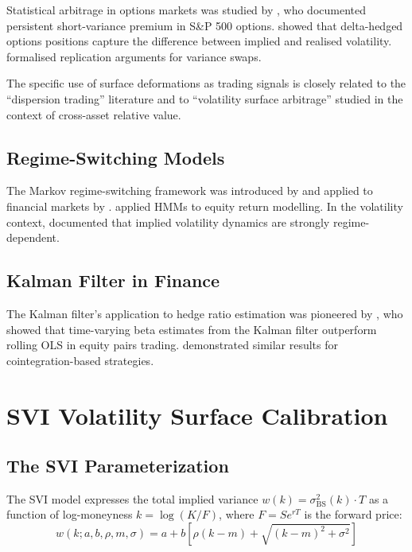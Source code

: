 \documentclass[12pt, letterpaper]{article}
\begin{document}
Statistical arbitrage in options markets was studied by
\citet{bondarenko2004statistical}, who documented persistent short-variance
premium in S\&P 500 options. \citet{delta_hedging_profits} showed that
delta-hedged options positions capture the difference between implied and
realised volatility. \citet{carr2012static} formalised replication arguments
for variance swaps.

The specific use of surface deformations as trading signals is closely related
to the ``dispersion trading'' literature \citep{deng2008volatility} and to
``volatility surface arbitrage'' studied in the context of cross-asset relative
value.

\subsection{Regime-Switching Models}

The Markov regime-switching framework was introduced by
\citet{hamilton1989new} and applied to financial markets by
\citet{ang2002regime}. \citet{hardy2001markov} applied HMMs to equity
return modelling. In the volatility context, \citet{engle2012dynamic}
documented that implied volatility dynamics are strongly regime-dependent.

\subsection{Kalman Filter in Finance}

The Kalman filter's application to hedge ratio estimation was pioneered by
\citet{alexander2008market}, who showed that time-varying beta estimates
from the Kalman filter outperform rolling OLS in equity pairs trading.
\citet{do2006does} demonstrated similar results for cointegration-based
strategies.

\section{SVI Volatility Surface Calibration}
\label{sec:svi}

\subsection{The SVI Parameterization}

The SVI model \citep{gatheral2004parsimonious} expresses the total implied
variance $w(k) = \sigma^2_{\text{BS}}(k) \cdot T$ as a function of
log-moneyness $k = \log(K/F)$, where $F = Se^{rT}$ is the forward price:
\begin{equation}
  w(k; a, b, \rho, m, \sigma) = a + b\left[\rho(k-m) + \sqrt{(k-m)^2 + \sigma^2}\right]
  \label{eq:svi_main}
\end{equation}
\end{document}
